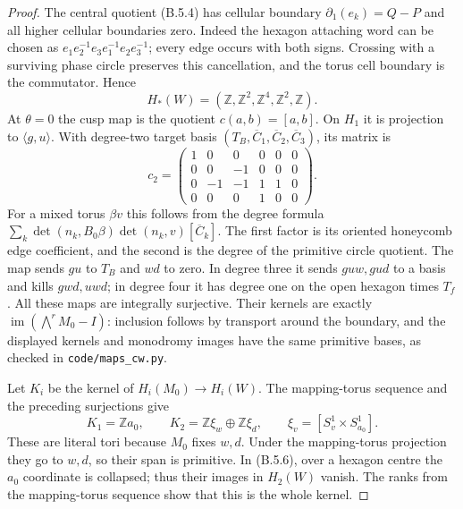 \begin{proof}
The central quotient (B.5.4) has cellular boundary
$\partial_1(e_k)=Q-P$ and all higher cellular
boundaries zero.  Indeed the hexagon attaching word
can be chosen as
$e_1e_2^{-1}e_3e_1^{-1}e_2e_3^{-1}$; every edge occurs
with both signs.  Crossing with a surviving phase
circle preserves this cancellation, and the torus
cell boundary is the commutator.  Hence
\[
 H_*(W)=(\mathbb Z,\mathbb Z^2,\mathbb Z^4,
                       \mathbb Z^2,\mathbb Z).
\]
At $\theta=0$ the cusp map is the quotient
$c(a,b)=[a,b]$.  On $H_1$ it is projection to
$\langle g,u\rangle$.  With degree-two target basis
$(T_B,\overline C_1,\overline C_2,\overline C_3)$,
its matrix is
\[
 c_2=\begin{pmatrix}
 1&0&0&0&0&0\\0&0&-1&0&0&0\\
 0&-1&-1&1&1&0\\0&0&0&1&0&0
 \end{pmatrix}.
 \tag{B.5.16}
\]
For a mixed torus $\beta v$ this follows from the
degree formula
$\sum_k\det(n_k,B_0\beta)\det(n_k,v)[\overline C_k]$.
The first factor is its oriented honeycomb edge
coefficient, and the second is the degree of the
primitive circle quotient.  The map sends $gu$ to
$T_B$ and $wd$ to zero.  In degree three it sends
$guw,gud$ to a basis and kills $gwd,uwd$; in degree
four it has degree one on the open hexagon times
$T_f$.  All these maps are integrally surjective.
Their kernels are exactly
$\operatorname{im}(\bigwedge^r M_0-I)$: inclusion
follows by transport around the boundary, and the
displayed kernels and monodromy images have the
same primitive bases, as checked in
\texttt{code/maps\_cw.py}.

Let $K_i$ be the kernel of $H_i(M_0)\to H_i(W)$.
The mapping-torus sequence and the preceding
surjections give
\[
 K_1=\mathbb Z a_0,\qquad
 K_2=\mathbb Z\xi_w\oplus\mathbb Z\xi_d,
 \qquad \xi_v=[S^1_v\times S^1_{a_0}].
 \tag{B.5.17}
\]
These are literal tori because $M_0$ fixes $w,d$.
Under the mapping-torus projection they go to $w,d$,
so their span is primitive.  In (B.5.6), over a
hexagon centre the $a_0$ coordinate is collapsed;
thus their images in $H_2(W)$ vanish.  The ranks
from the mapping-torus sequence show that this is
the whole kernel.


\end{proof}
